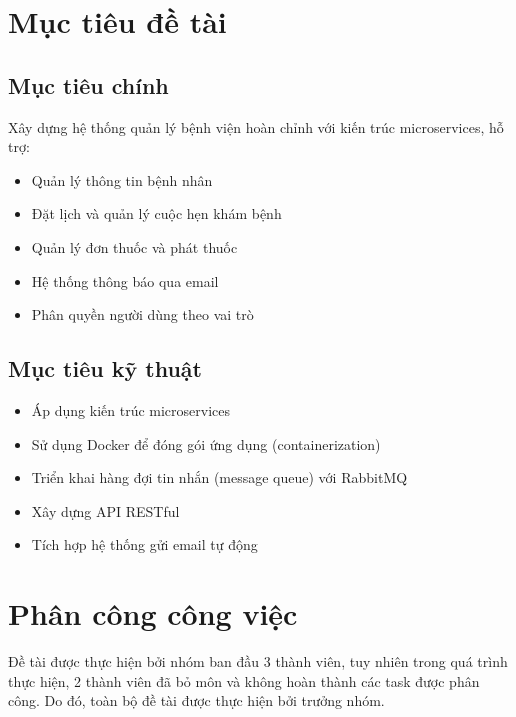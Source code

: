 \documentclass[12pt,a4paper]{report}
\begin{document}
\section{Mục tiêu đề tài}
\subsection{Mục tiêu chính}
Xây dựng hệ thống quản lý bệnh viện hoàn chỉnh với kiến trúc microservices, hỗ trợ:
\begin{itemize}
    \item Quản lý thông tin bệnh nhân
    \item Đặt lịch và quản lý cuộc hẹn khám bệnh
    \item Quản lý đơn thuốc và phát thuốc
    \item Hệ thống thông báo qua email
    \item Phân quyền người dùng theo vai trò
\end{itemize}

\subsection{Mục tiêu kỹ thuật}
\begin{itemize}
    \item Áp dụng kiến trúc microservices
    \item Sử dụng Docker để đóng gói ứng dụng (containerization)
    \item Triển khai hàng đợi tin nhắn (message queue) với RabbitMQ
    \item Xây dựng API RESTful
    \item Tích hợp hệ thống gửi email tự động
\end{itemize}

\section{Phân công công việc}

Đề tài được thực hiện bởi nhóm ban đầu 3 thành viên, tuy nhiên trong quá trình thực hiện, 2 thành viên đã bỏ môn và không hoàn thành các task được phân công. Do đó, toàn bộ đề tài được thực hiện bởi trưởng nhóm.
\end{document}

